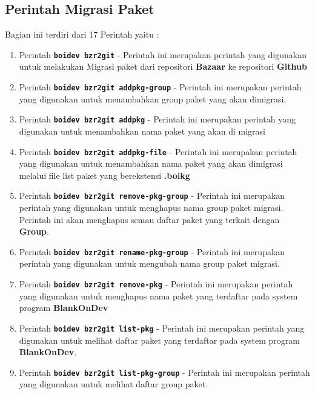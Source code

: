 \subsection{Perintah Migrasi Paket}
\noindent
Bagian ini terdiri dari 17 Perintah yaitu :
\begin{enumerate}
	\item Perintah \texttt{\textbf{boidev bzr2git}} - Perintah ini merupakan perintah yang digunakan untuk melakukan Migrasi paket dari repositori \textbf{Bazaar} ke repositori \textbf{Github}
	
	\item Perintah \texttt{\textbf{boidev bzr2git addpkg-group}} - Perintah ini merupakan perintah yang digunakan untuk menambahkan group paket yang akan dimigrasi.

	\item Perintah \texttt{\textbf{boidev bzr2git addpkg}} - Perintah ini merupakan perintah yang digunakan untuk menambahkan nama paket yang akan di migrasi

	\item Perintah \texttt{\textbf{boidev bzr2git addpkg-file}} - Perintah ini merupakan perintah yang digunakan untuk menambahkan nama paket yang akan dimigrasi melalui file list paket yang berekstensi \textbf{.boikg}

	\item Perintah \texttt{\textbf{boidev bzr2git remove-pkg-group}} - Perintah ini merupakan perintah yang digunakan untuk menghapus nama group paket migrasi. Perintah ini akan menghapus semau daftar paket yang terkait dengan \textbf{Group}.

	\item Perintah \texttt{\textbf{boidev bzr2git rename-pkg-group}} - Perintah ini merupakan perintah yang digunakan untuk mengubah nama group paket migrasi.

	\item Perintah \texttt{\textbf{boidev bzr2git remove-pkg}} - Perintah ini merupakan perintah yang digunakan untuk menghapus nama paket yang terdaftar pada system program \textbf{BlankOnDev}

	\item Perintah \texttt{\textbf{boidev bzr2git list-pkg}} - Perintah ini merupakan perintah yang digunakan untuk melihat daftar paket yang terdaftar pada system program \textbf{BlankOnDev}.

	\item Perintah \texttt{\textbf{boidev bzr2git list-pkg-group}} - Perintah ini merupakan perintah yang digunakan untuk melihat daftar group paket.


\end{enumerate}
